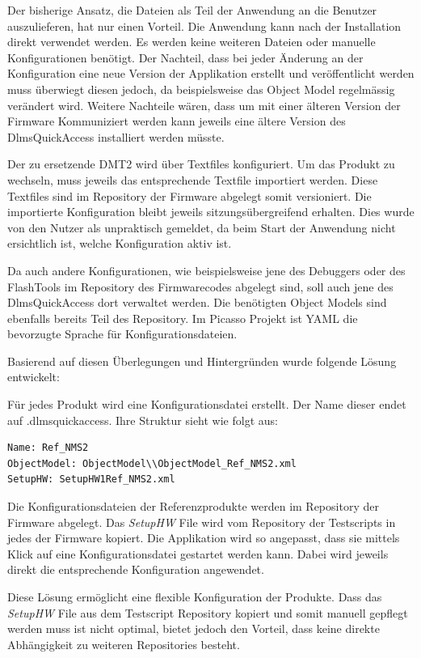 Der bisherige Ansatz, die Dateien als Teil der Anwendung an die Benutzer auszulieferen, hat nur einen Vorteil.
Die Anwendung kann nach der Installation direkt verwendet werden. Es werden keine weiteren Dateien oder manuelle Konfigurationen benötigt.
Der Nachteil, dass bei jeder Änderung an der Konfiguration eine neue Version der Applikation erstellt und veröffentlicht werden muss überwiegt diesen jedoch, da beispielsweise das Object Model regelmässig verändert wird.
Weitere Nachteile wären, dass um mit einer älteren Version der Firmware Kommuniziert werden kann jeweils eine ältere Version des DlmsQuickAccess installiert werden müsste.

Der zu ersetzende \ac{DMT2} wird über Textfiles konfiguriert.
Um das Produkt zu wechseln, muss jeweils das entsprechende Textfile importiert werden.
Diese Textfiles sind im Repository der Firmware abgelegt somit versioniert.
Die importierte Konfiguration bleibt jeweils sitzungsübergreifend erhalten.
Dies wurde von den Nutzer als unpraktisch gemeldet, da beim Start der Anwendung nicht ersichtlich ist, welche Konfiguration aktiv ist.

Da auch andere Konfigurationen, wie beispielsweise jene des Debuggers oder des FlashTools im Repository des Firmwarecodes abgelegt sind, soll auch jene des DlmsQuickAccess dort verwaltet werden.
Die benötigten Object Models sind ebenfalls bereits Teil des Repository.
Im Picasso Projekt ist \ac{YAML} die bevorzugte Sprache für Konfigurationsdateien.

Basierend auf diesen Überlegungen und Hintergründen wurde folgende Lösung entwickelt:

Für jedes Produkt wird eine Konfigurationsdatei erstellt.
Der Name dieser endet auf .dlmsquickaccess.
Ihre Struktur sieht wie folgt aus:
\begin{verbatim}
Name: Ref_NMS2
ObjectModel: ObjectModel\\ObjectModel_Ref_NMS2.xml
SetupHW: SetupHW1Ref_NMS2.xml
\end{verbatim}
Die Konfigurationsdateien der Referenzprodukte werden im Repository der Firmware abgelegt.
Das \textit{SetupHW} File wird vom Repository der Testscripts in jedes der Firmware kopiert.
Die Applikation wird so angepasst, dass sie mittels Klick auf eine Konfigurationsdatei gestartet werden kann.
Dabei wird jeweils direkt die entsprechende Konfiguration angewendet.

Diese Lösung ermöglicht eine flexible Konfiguration der Produkte.
Dass das \textit{SetupHW} File aus dem Testscript Repository kopiert und somit manuell gepflegt werden muss ist nicht optimal, bietet jedoch den Vorteil, dass keine direkte Abhängigkeit zu weiteren Repositories besteht.

